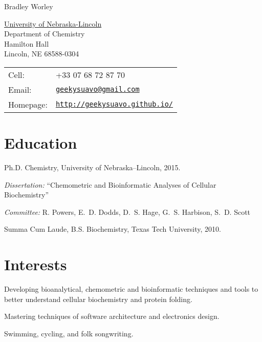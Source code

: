 \documentclass[letterpaper]{article}
\def\name{Bradley Worley}
\renewenvironment{itemize}{
  \begin{list}{}{
    \setlength{\leftmargin}{1.5em}
  }
}{
  \end{list}
}
\begin{document}
{\huge \name}
\vspace{0.25in}

\begin{minipage}{0.45\linewidth}
  \href{http://www.unl.edu/}{University of Nebraska-Lincoln} \\
  Department of Chemistry \\
  Hamilton Hall \\
  Lincoln, NE 68588-0304
\end{minipage}
\begin{minipage}{0.45\linewidth}
  \begin{tabular}{ll}
    Cell: &  +33 07 68 72 87 70 \\
    Email: & \href{mailto:geekysuavo@gmail.com}
                     {\tt geekysuavo@gmail.com} \\
    Homepage: & \href{http://geekysuavo.github.io/}
                 {\tt http://geekysuavo.github.io/} \\
  \end{tabular}
\end{minipage}


\section*{Education}

\begin{itemize}
  \item Ph.D. Chemistry, University of Nebraska--Lincoln, 2015.
  \begin{itemize}
    \item \emph{Dissertation:} ``Chemometric and Bioinformatic Analyses
      of Cellular Biochemistry''
    \item \emph{Committee:}
      R. Powers, E.~D. Dodds, D.~S. Hage,
      G.~S. Harbison, S.~D. Scott
  \end{itemize}
  \item Summa Cum Laude, B.S. Biochemistry, Texas Tech University, 2010.
\end{itemize}


\section*{Interests}

\begin{itemize}
\item{
  Developing bioanalytical, chemometric and bioinformatic techniques and
  tools to better understand cellular biochemistry and protein folding.
}
\item{
  Mastering techniques of software architecture and electronics design.
}
\item{
  Swimming, cycling, and folk songwriting.
}
\end{itemize}
\end{document}
